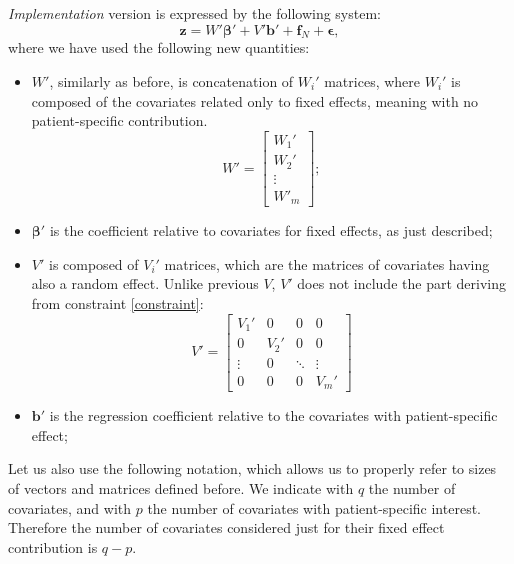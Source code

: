 \textit{Implementation} version is expressed by the following system:
\begin{equation}
	\bm{z}=W' \bm{\beta}' +V'\bm{b}' +\bm{f}_N + \bm{\epsilon},
\end{equation}
where we have used the following new quantities:
\begin{itemize}
	\item $W'$, similarly as before, is concatenation of $W_i'$ matrices, where $W_i'$ is composed of the covariates related only to fixed effects, meaning with no patient-specific contribution.
	      \begin{equation}
		      W'=
		      \begin{bmatrix*}
			      W_1'\\
			      W_2'\\
			      \vdots\\
			      W'_{m}
		      \end{bmatrix*}
		      ;
	      \end{equation}
	\item $\bm{\beta}'$ is the coefficient relative to covariates for
	      fixed effects, as just described; \item $V'$ is composed of $V_i'$ matrices,
	      which are the matrices of covariates having also a random effect. Unlike
	      previous $V$, $V'$ does not include the part deriving from constraint
	      \ref{constraint}:
	      \begin{equation}
		      V'=
		      \begin{bmatrix*}
			      V_1' & 0 & 0 & 0\\
			      0 & V_2' & 0 & 0\\
			      \vdots & 0 & \ddots & \vdots\\
			      0 & 0 & 0 & V_{m}'
		      \end{bmatrix*}
	      \end{equation}
	\item $\bm{b}'$ is the regression coefficient relative to the
	      covariates with patient-specific effect;
\end{itemize}
Let us also use the following notation, which allows us to properly
refer to sizes of vectors and matrices defined before. We indicate with $q$ the
number of covariates, and with $p$ the number of covariates with
patient-specific interest. Therefore the number of covariates considered just
for their fixed effect contribution is $q-p$.

